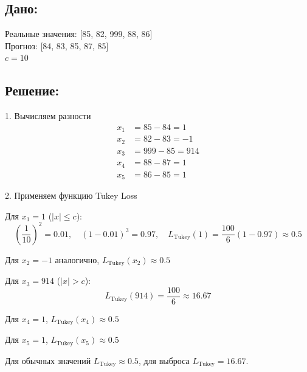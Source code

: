 \documentclass[12pt]{article}
\theoremstyle{definition}
\theoremstyle{definition}
\theoremstyle{definition}
\theoremstyle{remark}
\theoremstyle{remark}
\begin{document}
\subsection*{Дано:}
Реальные значения: [85, 82, 999, 88, 86] \\
Прогноз: [84, 83, 85, 87, 85] \\
$c = 10$

\subsection*{Решение:}

1. Вычисляем разности
\begin{align*}
x_1 &= 85 - 84 = 1 \\
x_2 &= 82 - 83 = -1 \\
x_3 &= 999 - 85 = 914 \\
x_4 &= 88 - 87 = 1 \\
x_5 &= 86 - 85 = 1
\end{align*}

2. Применяем функцию Tukey Loss

Для $x_1 = 1$ ($|x| \leq c$):
\[
\left(\frac{1}{10}\right)^2 = 0.01, \quad (1 - 0.01)^3 = 0.97, \quad L_{\text{Tukey}}(1) = \frac{100}{6}(1 - 0.97) \approx 0.5
\]

Для $x_2 = -1$ аналогично, $L_{\text{Tukey}}(x_2) \approx 0.5$

Для $x_3 = 914$ ($|x| > c$):
\[
L_{\text{Tukey}}(914) = \frac{100}{6} \approx 16.67
\]

Для $x_4 = 1$, $L_{\text{Tukey}}(x_4) \approx 0.5$

Для $x_5 = 1$, $L_{\text{Tukey}}(x_5) \approx 0.5$

Для обычных значений $L_{\text{Tukey}} \approx 0.5$, для выброса $L_{\text{Tukey}} = 16.67$.
\end{document}
